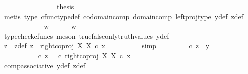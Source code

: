 \begin{isabellebody}
\isanewline
\ \ \ \ \ \ \isamarkupfalse%
\isanewline
\ \ \ \ \ \ \isamarkupfalse%
\ \isamarkupfalse%
\ {\isacharquery}{\kern0pt}thesis\isanewline
\ \ \ \ \ \ \ \ \isamarkupfalse%
\ {\isacharparenleft}{\kern0pt}metis\ {\isasymrho}{\isacharunderscore}{\kern0pt}type\ cfunc{\isacharunderscore}{\kern0pt}type{\isacharunderscore}{\kern0pt}def\ codomain{\isacharunderscore}{\kern0pt}comp\ domain{\isacharunderscore}{\kern0pt}comp\ left{\isacharunderscore}{\kern0pt}proj{\isacharunderscore}{\kern0pt}type\ y{\isacharunderscore}{\kern0pt}def\ z{\isacharunderscore}{\kern0pt}def{\isacharparenright}{\kern0pt}\isanewline
\ \ \ \ \isamarkupfalse%
\isanewline
\ \ \ \ \ \ \isamarkupfalse%
\ {\isachardoublequoteopen}w\ {\isasymnoteq}\ {\isasymt}{\isachardoublequoteclose}\ \isamarkupfalse%
\ \isamarkupfalse%
\ {\isachardoublequoteopen}w\ {\isacharequal}{\kern0pt}\ {\isasymf}{\isachardoublequoteclose}\ \ \isanewline
\ \ \ \ \ \ \ \ \isamarkupfalse%
\ {\isacharparenleft}{\kern0pt}typecheck{\isacharunderscore}{\kern0pt}cfuncs{\isacharcomma}{\kern0pt}\ meson\ true{\isacharunderscore}{\kern0pt}false{\isacharunderscore}{\kern0pt}only{\isacharunderscore}{\kern0pt}truth{\isacharunderscore}{\kern0pt}values\ y{\isacharunderscore}{\kern0pt}def{\isacharparenright}{\kern0pt}\isanewline
\ \ \ \ \ \ \isamarkupfalse%
\ z\ \ z{\isacharunderscore}{\kern0pt}def{\isacharcolon}{\kern0pt}\ {\isachardoublequoteopen}z\ {\isacharequal}{\kern0pt}\ right{\isacharunderscore}{\kern0pt}coproj\ X\ X\ {\isasymcirc}\isactrlsub c\ x{\isachardoublequoteclose}\isanewline
\ \ \ \ \ \ \ \ \isamarkupfalse%
\ simp\isanewline
\ \ \ \ \ \ \isamarkupfalse%
\ {\isachardoublequoteopen}{\isasymrho}\ {\isasymcirc}\isactrlsub c\ z\ {\isacharequal}{\kern0pt}\ y{\isachardoublequoteclose}\isanewline
\ \ \ \ \ \ \isamarkupfalse%
\ {\isacharminus}{\kern0pt}\ \isanewline
\ \ \ \ \ \ \ \ \isamarkupfalse%
\ {\isachardoublequoteopen}{\isasymrho}\ {\isasymcirc}\isactrlsub c\ z\ {\isacharequal}{\kern0pt}\ {\isacharparenleft}{\kern0pt}{\isasymrho}\ {\isasymcirc}\isactrlsub c\ right{\isacharunderscore}{\kern0pt}coproj\ X\ X{\isacharparenright}{\kern0pt}\ {\isasymcirc}\isactrlsub c\ x{\isachardoublequoteclose}\isanewline
\ \ \ \ \ \ \ \ \ \ \isamarkupfalse%
\ comp{\isacharunderscore}{\kern0pt}associative{}\ y{\isacharunderscore}{\kern0pt}def\ z{\isacharunderscore}{\kern0pt}def\ \isamarkupfalse%

\end{isabellebody}
